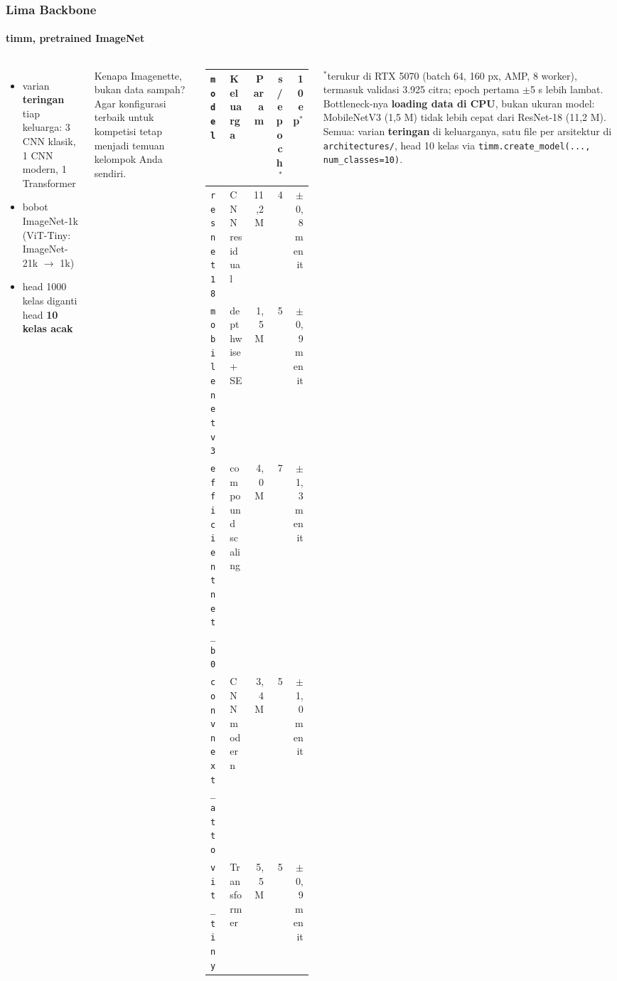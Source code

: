 \documentclass[t,aspectratio=169,xcolor={dvipsnames,table}]{beamer}
\begin{document}
\begin{frame}
    \frametitle{Lima Backbone}
    \framesubtitle{timm, pretrained ImageNet}
    \footnotesize

    \begin{columns}[T]
        \begin{itemize}
            \item varian \textbf{teringan} tiap keluarga: 3 CNN klasik, 1 CNN modern, 1 Transformer
            \item bobot ImageNet-1k (ViT-Tiny: ImageNet-21k $\to$ 1k)
            \item head 1000 kelas diganti head \textbf{10 kelas acak}
        \end{itemize}
        {\scriptsize\color{dlMute} Kenapa Imagenette, bukan data sampah? Agar konfigurasi terbaik untuk kompetisi tetap menjadi temuan kelompok Anda sendiri.}

        \vspace{4pt}
        \scriptsize
        \setlength{\tabcolsep}{4pt}
        \renewcommand{\arraystretch}{1.2}
        \begin{tabular}{llrrr}
            \toprule
            \texttt{model} & \textbf{Keluarga} & \textbf{Param} & \textbf{s/epoch}$^{*}$ & \textbf{10 ep}$^{*}$ \\
            \midrule
            \texttt{resnet18} & CNN residual & 11,2 M & 4 & $\pm$0,8 menit \\
            \texttt{mobilenetv3} & depthwise + SE & 1,5 M & 5 & $\pm$0,9 menit \\
            \texttt{efficientnet\_b0} & compound scaling & 4,0 M & 7 & $\pm$1,3 menit \\
            \texttt{convnext\_atto} & CNN modern & 3,4 M & 5 & $\pm$1,0 menit \\
            \texttt{vit\_tiny} & Transformer & 5,5 M & 5 & $\pm$0,9 menit \\
            \bottomrule
        \end{tabular}

        \vspace{0.15cm}
        {\scriptsize $^{*}$terukur di RTX 5070 (batch 64, 160 px, AMP, 8 worker), termasuk validasi 3.925 citra; epoch pertama $\pm$5 s lebih lambat. Bottleneck-nya \textbf{loading data di CPU}, bukan ukuran model: MobileNetV3 (1,5 M) tidak lebih cepat dari ResNet-18 (11,2 M). Semua: varian \textbf{teringan} di keluarganya, satu file per arsitektur di \texttt{architectures/}, head 10 kelas via \texttt{timm.create\_model(..., num\_classes=10)}.}
    \end{columns}
\end{frame}
\end{document}
